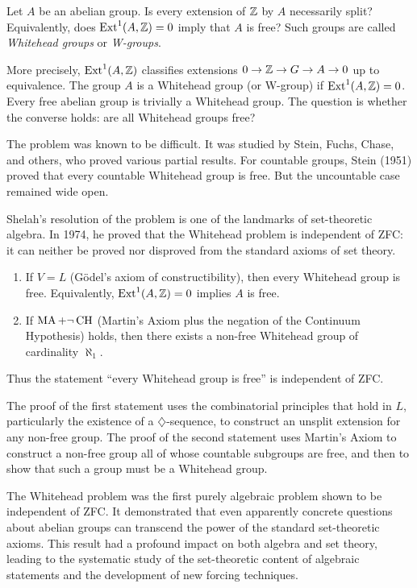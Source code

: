 \begin{condition}
Let \(A\) be an abelian group. Is every extension of \(\mathbb{Z}\) by \(A\) necessarily split? Equivalently, does \(\operatorname{Ext}^1(A,\mathbb{Z}) = 0\) imply that \(A\) is free? Such groups are called \emph{Whitehead groups} or \emph{W-groups}.
\end{condition}

More precisely, \(\operatorname{Ext}^1(A,\mathbb{Z})\) classifies extensions \(0 \to \mathbb{Z} \to G \to A \to 0\) up to equivalence. The group \(A\) is a Whitehead group (or W-group) if \(\operatorname{Ext}^1(A,\mathbb{Z}) = 0\). Every free abelian group is trivially a Whitehead group. The question is whether the converse holds: are all Whitehead groups free?

The problem was known to be difficult. It was studied by Stein, Fuchs, Chase, and others, who proved various partial results. For countable groups, Stein (1951) proved that every countable Whitehead group is free. But the uncountable case remained wide open.

Shelah's resolution of the problem is one of the landmarks of set-theoretic algebra. In 1974, he proved that the Whitehead problem is independent of ZFC: it can neither be proved nor disproved from the standard axioms of set theory.

\begin{theorem}
\begin{enumerate}
    \item If \(V = L\) (G\"odel's axiom of constructibility), then every Whitehead group is free. Equivalently, \(\operatorname{Ext}^1(A,\mathbb{Z}) = 0\) implies \(A\) is free.
    \item If \(\operatorname{MA} + \neg\operatorname{CH}\) (Martin's Axiom plus the negation of the Continuum Hypothesis) holds, then there exists a non-free Whitehead group of cardinality \(\aleph_1\).
\end{enumerate}
Thus the statement ``every Whitehead group is free'' is independent of ZFC.
\end{theorem}

The proof of the first statement uses the combinatorial principles that hold in \(L\), particularly the existence of a \(\diamondsuit\)-sequence, to construct an unsplit extension for any non-free group. The proof of the second statement uses Martin's Axiom to construct a non-free group all of whose countable subgroups are free, and then to show that such a group must be a Whitehead group.

The Whitehead problem was the first purely algebraic problem shown to be independent of ZFC. It demonstrated that even apparently concrete questions about abelian groups can transcend the power of the standard set-theoretic axioms. This result had a profound impact on both algebra and set theory, leading to the systematic study of the set-theoretic content of algebraic statements and the development of new forcing techniques.

